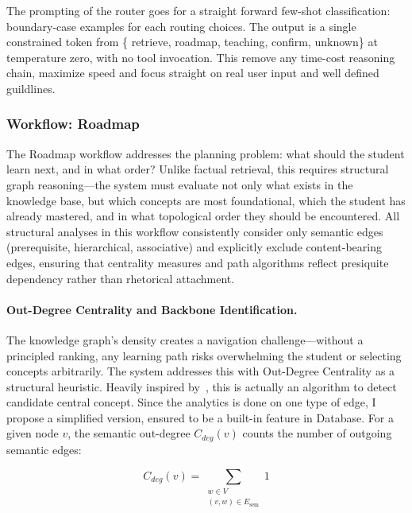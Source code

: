 The prompting of the router goes for a straight forward {few-shot classification}: boundary-case examples for each routing choices. The output is a single constrained token 
from \{ {retrieve},  {roadmap},  {teaching},  {confirm},  {unknown}\} at temperature zero, with no tool invocation. This remove any time-cost reasoning chain, 
maximize speed and focus straight on real user input and well defined guildlines.

\subsubsection{Workflow: Roadmap}\label{subsub:wf_roadmap}

The Roadmap workflow addresses the planning problem:  {what should the student learn next, and in what order?} Unlike factual retrieval, this requires structural 
graph reasoning---the system must evaluate not only what exists in the knowledge base, but which concepts are most foundational, which the student has already 
mastered, and in what topological order they should be encountered. All structural analyses in this workflow consistently consider only semantic edges 
(prerequisite, hierarchical, associative) and explicitly exclude content-bearing edges, ensuring that centrality measures and path algorithms reflect 
presiquite dependency rather than rhetorical attachment.

\paragraph*{Out-Degree Centrality and Backbone Identification.}

The knowledge graph's density creates a navigation challenge---without a principled ranking, any learning path risks overwhelming the student or selecting concepts 
arbitrarily. The system addresses this with  {Out-Degree Centrality} as a structural heuristic. Heavily inspired by~\cite{DKG}, this is actually an algorithm to 
detect candidate central concept. Since the analytics is done on one type of edge, I propose a simplified version, ensured to be a built-in feature in Database. 
For a given node \(v\), the semantic out-degree \(C_{deg}(v)\) counts the number of outgoing semantic edges:

\begin{equation}
    C_{deg}(v) = \sum_{\substack{w \in V \\ (v,w) \in E_{\mathrm{sem}}}} 1
\end{equation}

